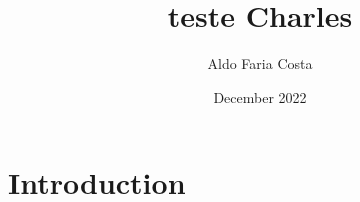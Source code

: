\documentclass{article}
\title{teste Charles}
\author{Aldo Faria Costa}
\date{December 2022}
\begin{document}
\maketitle

\section{Introduction}
\end{document}
